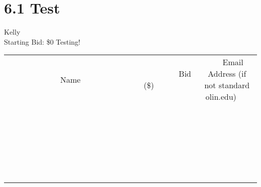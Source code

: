 \documentclass[11pt]{article}
\begin{document}
\section*{6.1 Test}
Kelly
\\
Starting Bid: \$0
\newline
Testing!
\\[6ex]
\begin{tabular}{c c c}
~~~~~~~~~~~~~Name~~~~~~~~~~~~~ & ~~~~~~~~~Bid (\$)~~~~~~~~~  & ~~~Email Address (if not standard olin.edu)~~~\\
 & & \\
\hline
 & & \\
\hline
 & & \\
\hline
 & & \\
\hline
 & & \\
\hline
 & & \\
\hline
 & & \\
\hline
 & & \\
\hline
 & & \\
\hline
 & & \\
\hline
 & & \\
\hline
 & & \\
\hline
 & & \\
\hline
 & & \\
\hline
 & & \\
\hline
 & & \\
\hline
 & & \\
\hline
 & & \\
\hline
 & & \\
\hline
 & & \\
\hline
 & & \\
\hline
 & & \\
\hline
 & & \\
\hline
 & & \\
\hline
 & & \\
\hline
 & & \\
\hline
\end{tabular}
\newpage
\end{document}
